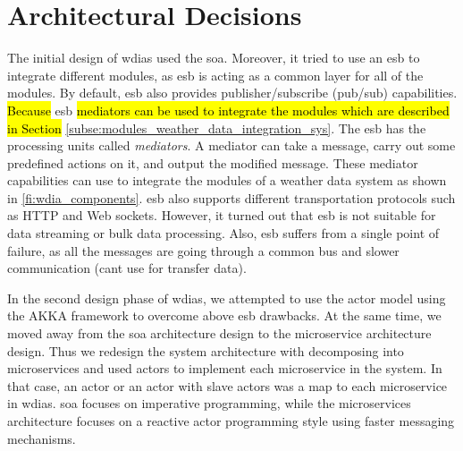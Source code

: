 \section{Architectural Decisions}
\label{se:architectural_decisions}

The initial design of \acrshort{wdias} used the \acrfull{soa}. Moreover, it tried to use an \acrfull{esb} to integrate different modules, as \acrshort{esb} is acting as a common layer for all of the modules. By default, \acrshort{esb} also provides publisher/subscribe (pub/sub) capabilities.
\hl{Because} \acrshort{esb} \hl{mediators can be used to integrate the modules which are described in Section} \ref{subse:modules_weather_data_integration_sys}. 
The \acrshort{esb} has the processing units called \emph{mediators}. A mediator can take a message, carry out some predefined actions on it, and output the modified message. These mediator capabilities can use to integrate the modules of a weather data system as shown in \cref{fi:wdia_components}. \acrshort{esb} also supports different transportation protocols such as HTTP and Web sockets. However, it turned out that \acrshort{esb} is not suitable for data streaming or bulk data processing. Also, \acrshort{esb} suffers from a single point of failure, as all the messages are going through a common bus and slower communication (cant use for transfer data).

In the second design phase of \acrshort{wdias}, we attempted to use the actor model using the AKKA framework \cite{HewittWhyModel} to overcome above \acrshort{esb} drawbacks. At the same time, we moved away from the \acrshort{soa} architecture design to the microservice architecture design. Thus we redesign the system architecture with decomposing into microservices and used actors to implement each microservice in the system. In that case, an actor or an actor with slave actors was a map to each microservice in \acrshort{wdias}. \acrshort{soa} focuses on imperative programming, while the microservices architecture focuses on a reactive actor programming style using faster messaging mechanisms. 

